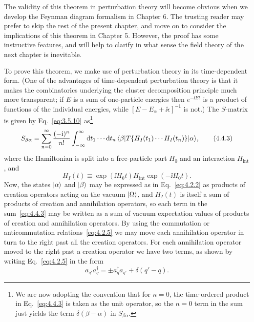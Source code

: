 The validity of this theorem in perturbation theory will become obvious when we
develop the Feynman diagram formalism in Chapter 6. The trusting reader may
prefer to skip the rest of the present chapter, and move on to consider the
implications of this theorem in Chapter 5. However, the proof has some
instructive features, and will help to clarify in what sense the field theory of
the next chapter is inevitable.

To prove this theorem, we make use of perturbation theory in its time-dependent
form. (One of the advantages of time-dependent perturbation theory is that it
makes the combinatorics underlying the cluster decomposition principle much
more transparent; if $E$ is a sum of one-particle energies then $e^{-\ii Et}$ is a
product of functions of the individual energies, while
$[E-E_\alpha+\ii\epsilon]^{-1}$ is not.) The $S$-matrix is given by Eq.~\eqref{eq:3.5.10}
as\footnote{We are now adopting the convention that for $n=0$, the time-ordered
product in Eq.~\eqref{eq:4.4.3} is taken as the unit operator, so the $n=0$ term in the
sum just yields the term $\delta(\beta-\alpha)$ in $S_{\beta\alpha}$.}
\begin{equation}
S_{\beta\alpha}=\sum_{n=0}^{\infty}\frac{(-\mathrm{i})^n}{n!}
 \int_{-\infty}^{\infty}\mathop{}\!\mathrm{d} t_1\cdots \mathop{}\!\mathrm{d} t_n\,
 \langle \beta\rvert T\{H_I(t_1)\cdots H_I(t_n)\}\lvert \alpha\rangle,
\tag{4.4.3}
\label{eq:4.4.3}
\end{equation}
where the Hamiltonian is split into a free-particle part $H_0$ and an
interaction $H_{\mathrm{int}}$, and
\begin{equation}
H_I(t)\equiv \exp(\ii H_0t)H_{\mathrm{int}}\exp(-\ii H_0t).
\tag{4.4.4}
\label{eq:4.4.4}
\end{equation}
Now, the states $\lvert \alpha\rangle$ and $\lvert \beta\rangle$ may be expressed as in
Eq.~\eqref{eq:4.2.2} as products of creation operators acting on the vacuum
$\lvert \Omega\rangle$, and $H_I(t)$ is itself a sum of products of creation and
annihilation operators, so each term in the sum~\eqref{eq:4.4.3} may be written as a sum
of vacuum expectation values of products of creation and annihilation
operators. By using the commutation or anticommutation relations~\eqref{eq:4.2.5} we may
move each annihilation operator in turn to the right past all the creation
operators. For each annihilation operator moved to the right past a creation
operator we have two terms, as shown by writing Eq.~\eqref{eq:4.2.5} in the form
\[
a_{q'}a^\dagger_q=\mathbin{\pm}a^\dagger_q a_{q'}+\delta(q'-q).
\]

